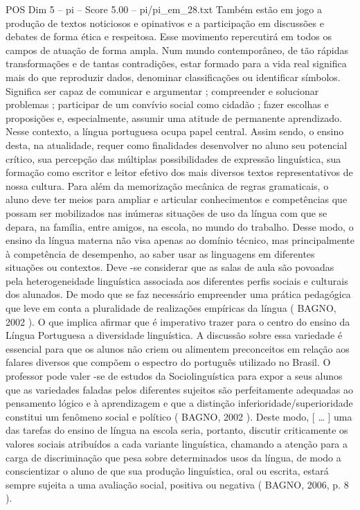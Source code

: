 \begin{textsample}{POS Dim 5 – pi – Score 5.00 – pi/pi\_em\_28.txt}
Também estão em jogo a produção de textos noticiosos e opinativos e a participação em discussões e debates de forma ética e respeitosa.
Esse movimento repercutirá em todos os campos de atuação de forma ampla.
Num mundo contemporâneo, de tão rápidas transformações e de tantas contradições, estar formado para a vida real significa mais do que reproduzir dados, denominar classificações ou identificar símbolos.
Significa ser capaz de comunicar e argumentar ; compreender e solucionar problemas ; participar de um convívio social como cidadão ; fazer escolhas e proposições e, especialmente, assumir uma atitude de permanente aprendizado.
Nesse contexto, a língua portuguesa ocupa papel central.
Assim sendo, o ensino desta, na atualidade, requer como finalidades desenvolver no aluno seu potencial crítico, sua percepção das múltiplas possibilidades de expressão linguística, sua formação como escritor e leitor efetivo dos mais diversos textos representativos de nossa cultura.
Para além da memorização mecânica de regras gramaticais, o aluno deve ter meios para ampliar e articular conhecimentos e competências que possam ser mobilizados nas inúmeras situações de uso da língua com que se depara, na família, entre amigos, na escola, no mundo do trabalho.
Desse modo, o ensino da língua materna não visa apenas ao domínio técnico, mas principalmente à competência de desempenho, ao saber usar as linguagens em diferentes situações ou contextos.
Deve -se considerar que as salas de aula são povoadas pela heterogeneidade linguística associada aos diferentes perfis sociais e culturais dos alunados.
De modo que se faz necessário empreender uma prática pedagógica que leve em conta a pluralidade de realizações empíricas da língua ( BAGNO, 2002 ).
O que implica afirmar que é imperativo trazer para o centro do ensino da Língua Portuguesa a diversidade linguística.
A discussão sobre essa variedade é essencial para que os alunos não criem ou alimentem preconceitos em relação aos falares diversos que compõem o espectro do português utilizado no Brasil.
O professor pode valer -se de estudos da Sociolinguística para expor a seus alunos que as variedades faladas pelos diferentes sujeitos são perfeitamente adequadas ao pensamento lógico e à aprendizagem e que a distinção inferioridade/superioridade constitui um fenômeno social e político ( BAGNO, 2002 ).
Deste modo, [ … ] uma das tarefas do ensino de língua na escola seria, portanto, discutir criticamente os valores sociais atribuídos a cada variante linguística, chamando a atenção para a carga de discriminação que pesa sobre determinados usos da língua, de modo a conscientizar o aluno de que sua produção linguística, oral ou escrita, estará sempre sujeita a uma avaliação social, positiva ou negativa ( BAGNO, 2006, p. 8 ).

\end{textsample}
